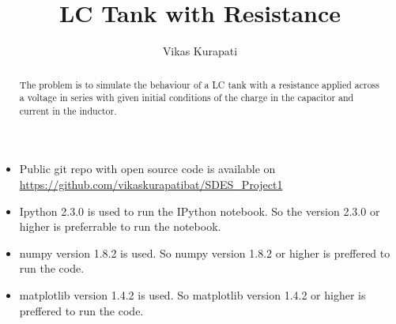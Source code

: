 \documentclass[12pt, a4paper]{report}
\title{\textbf{LC Tank with Resistance}}
\author{Vikas Kurapati}
\affil{Roll No. : 130010058}
\begin{document}
\maketitle
\newpage

\begin{abstract}
 The problem is to simulate the behaviour of a LC tank with a resistance applied across a voltage in series with given initial conditions of the charge in the capacitor and current in the inductor.
\end{abstract}

\begin{itemize}
\item Public git repo with open source code is available on \url{https://github.com/vikaskurapatibat/SDES_Project1}
\item Ipython 2.3.0 is used to run the IPython notebook. So the version 2.3.0 or higher is preferrable to run the notebook.
\item numpy version 1.8.2 is used. So numpy version 1.8.2 or higher is preffered to run the code.
\item matplotlib version 1.4.2 is used. So matplotlib version 1.4.2 or higher is preffered to run the code. 
\end{itemize}
\end{document}
